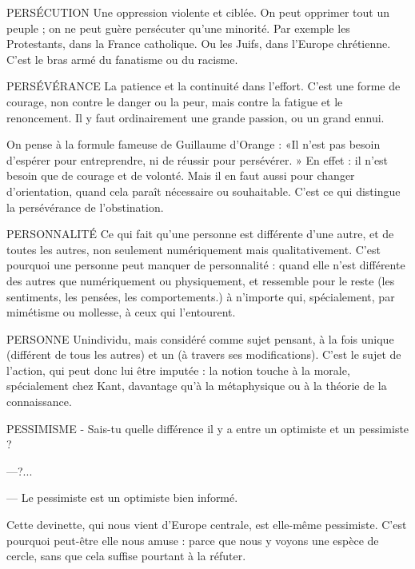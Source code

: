 PERSÉCUTION Une oppression violente et ciblée. On peut opprimer tout
un peuple ; on ne peut guère persécuter qu’une minorité.
Par exemple les Protestants, dans la France catholique. Ou les Juifs, dans
l’Europe chrétienne. C’est le bras armé du fanatisme ou du racisme.

PERSÉVÉRANCE La patience et la continuité dans l'effort. C’est une forme
de courage, non contre le danger ou la peur, mais contre
la fatigue et le renoncement. Il y faut ordinairement une grande passion, ou un
grand ennui.


On pense à la formule fameuse de Guillaume d'Orange : «Il n’est pas
besoin d’espérer pour entreprendre, ni de réussir pour persévérer. » En effet : il
n’est besoin que de courage et de volonté. Mais il en faut aussi pour changer
d'orientation, quand cela paraît nécessaire ou souhaitable. C’est ce qui distingue
la persévérance de l’obstination.

PERSONNALITÉ Ce qui fait qu’une personne est différente d’une autre, et
de toutes les autres, non seulement numériquement mais
qualitativement. C’est pourquoi une personne peut manquer de personnalité :
quand elle n’est différente des autres que numériquement ou physiquement, et
ressemble pour le reste (les sentiments, les pensées, les comportements.) à
n'importe qui, spécialement, par mimétisme ou mollesse, à ceux qui l’entourent.

PERSONNE  Unindividu, mais considéré comme sujet pensant, à la fois unique
(différent de tous les autres) et un (à travers ses modifications).
C’est le sujet de l’action, qui peut donc lui être imputée : la notion touche à la
morale, spécialement chez Kant, davantage qu’à la métaphysique ou à la
théorie de la connaissance.

PESSIMISME  - Sais-tu quelle différence il y a entre un optimiste et un pessimiste ?

—?...

— Le pessimiste est un optimiste bien informé.

Cette devinette, qui nous vient d'Europe centrale, est elle-même pessimiste.
C’est pourquoi peut-être elle nous amuse : parce que nous y voyons une espèce
de cercle, sans que cela suffise pourtant à la réfuter.

